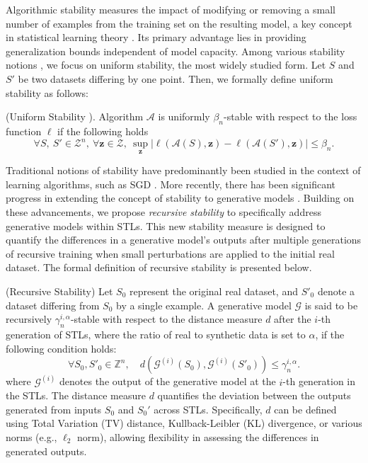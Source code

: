 Algorithmic stability measures the impact of modifying or removing a small number of examples from the training set on the resulting model, a key concept in statistical learning theory \citep{bousquet2002stability}. Its primary advantage lies in providing generalization bounds independent of model capacity. Among various stability notions \citep{shalev2010learnability}, we focus on uniform stability, the most widely studied form. Let $S$ and $S'$ be two datasets differing by one point. Then, we formally define uniform stability as follows:

\begin{definition}(Uniform Stability \citep{bousquet2002stability}). Algorithm $\mathcal{A}$ is uniformly $\beta_n$-stable with respect to the loss function $\ell$ if the following holds
$$
\forall S,\ S' \in \mathcal{Z}^n,\ \forall \boldsymbol{z} \in \mathcal{Z},\ \sup _{\boldsymbol{z}}\left|\ell(\mathcal{A}(S), \boldsymbol{z})-\ell\left(\mathcal{A}\left(S'\right), \boldsymbol{z}\right)\right| \leq \beta_n.
$$
\end{definition}
Traditional notions of stability have predominantly been studied in the context of learning algorithms, such as SGD \citep{lei2020fine}. More recently, there has been significant progress in extending the concept of stability to generative models \citep{farnia2021train,zheng2023toward,li2023transformers}. Building on these advancements, we propose \textit{recursive stability} to specifically address generative models within STLs. This new stability measure is designed to quantify the differences in a generative model’s outputs after multiple
generations of recursive training when small perturbations are applied to the initial real dataset. The formal definition of recursive stability is presented below.

\begin{definition}(Recursive Stability)\label{iterative stability}
Let \(S_0\) represent the original real dataset, and \(S'_0\) denote a dataset differing from \(S_0\) by a single example. A generative model \(\mathcal{G}\) is said to be recursively \(\gamma_n^{i,\alpha}\)-stable with respect to the distance measure \(d\) after the \(i\)-th generation of STLs, where the ratio of real to synthetic data is set to \(\alpha\), if the following condition holds:  
\[
\forall S_0, S'_0 \in \mathbb{Z}^n, \quad d\left(\mathcal{G}^{(i)}(S_0), \mathcal{G}^{(i)}(S'_0)\right) \leq \gamma_n^{i,\alpha}.
\]  
where $\mathcal{G}^{(i)}$ denotes the output of the generative model at the $i$-th generation in the STLs. The distance measure $d$ quantifies the deviation between the outputs generated from inputs $S_0$ and $S_0'$ across STLs. Specifically, $d$ can be defined using Total Variation (TV) distance, Kullback-Leibler (KL) divergence, or various norms (e.g., $\ell_2$ norm), allowing flexibility in assessing the differences in generated outputs.
\end{definition}
